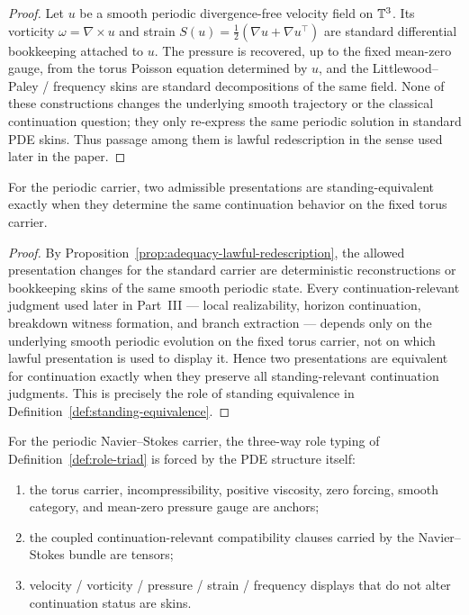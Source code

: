 \begin{proof}
Let $u$ be a smooth periodic divergence-free velocity field on $\mathbb{T}^3$.  Its vorticity
$\omega=\nabla\times u$ and strain $S(u)=\tfrac12(\nabla u+\nabla u^\top)$ are standard differential
bookkeeping attached to $u$.  The pressure is recovered, up to the fixed mean-zero gauge, from the
torus Poisson equation determined by $u$, and the Littlewood--Paley / frequency skins are standard
decompositions of the same field.  None of these constructions changes the underlying smooth
trajectory or the classical continuation question; they only re-express the same periodic solution in
standard PDE skins.  Thus passage among them is lawful redescription in the sense used later in the
paper.
\end{proof}

\begin{proposition}
\label{prop:adequacy-standing-equivalence}
For the periodic carrier, two admissible presentations are standing-equivalent exactly when they
determine the same continuation behavior on the fixed torus carrier.
\end{proposition}

\begin{proof}
By Proposition~\ref{prop:adequacy-lawful-redescription}, the allowed presentation changes for the
standard carrier are deterministic reconstructions or bookkeeping skins of the same smooth periodic
state.  Every continuation-relevant judgment used later in Part~III --- local realizability, horizon
continuation, breakdown witness formation, and branch extraction --- depends only on the underlying
smooth periodic evolution on the fixed torus carrier, not on which lawful presentation is used to
display it.  Hence two presentations are equivalent for continuation exactly when they preserve all
standing-relevant continuation judgments.  This is precisely the role of standing equivalence in
Definition~\ref{def:standing-equivalence}.
\end{proof}

\begin{proposition}
\label{prop:adequacy-role-triad}
For the periodic Navier--Stokes carrier, the three-way role typing of
Definition~\ref{def:role-triad} is forced by the PDE structure itself:
\begin{enumerate}[label=(\roman*), leftmargin=2.2em]
\item the torus carrier, incompressibility, positive viscosity, zero forcing, smooth category, and
mean-zero pressure gauge are anchors;
\item the coupled continuation-relevant compatibility clauses carried by the Navier--Stokes bundle are
tensors;
\item velocity / vorticity / pressure / strain / frequency displays that do not alter continuation
status are skins.
\end{enumerate}
\end{proposition}

